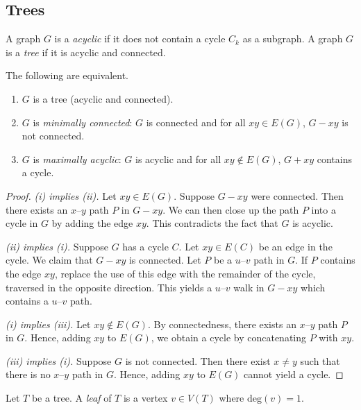 \subsection{Trees}
\begin{definition}
	A graph \( G \) is a \emph{acyclic} if it does not contain a cycle \( C_k \) as a subgraph.
	A graph \( G \) is a \emph{tree} if it is acyclic and connected.
\end{definition}
\begin{proposition}
	The following are equivalent.
	\begin{enumerate}
		\item \( G \) is a tree (acyclic and connected).
		\item \( G \) is \emph{minimally connected}: \( G \) is connected and for all \( xy \in E(G) \), \( G - xy \) is not connected.
		\item \( G \) is \emph{maximally acyclic}: \( G \) is acyclic and for all \( xy \not\in E(G) \), \( G + xy \) contains a cycle.
	\end{enumerate}
\end{proposition}
\begin{proof}
	\emph{(i) implies (ii).}
	Let \( xy \in E(G) \).
	Suppose \( G - xy \) were connected.
	Then there exists an \( x \)--\( y \) path \( P \) in \( G - xy \).
	We can then close up the path \( P \) into a cycle in \( G \) by adding the edge \( xy \).
	This contradicts the fact that \( G \) is acyclic.

	\emph{(ii) implies (i).}
	Suppose \( G \) has a cycle \( C \).
	Let \( xy \in E(C) \) be an edge in the cycle.
	We claim that \( G - xy \) is connected.
	Let \( P \) be a \( u \)--\( v \) path in \( G \).
	If \( P \) contains the edge \( xy \), replace the use of this edge with the remainder of the cycle, traversed in the opposite direction.
	This yields a \( u \)--\( v \) walk in \( G - xy \) which contains a \( u \)--\( v \) path.

	\emph{(i) implies (iii).}
	Let \( xy \not\in E(G) \).
	By connectedness, there exists an \( x \)--\( y \) path \( P \) in \( G \).
	Hence, adding \( xy \) to \( E(G) \), we obtain a cycle by concatenating \( P \) with \( xy \).

	\emph{(iii) implies (i).}
	Suppose \( G \) is not connected.
	Then there exist \( x \neq y \) such that there is no \( x \)--\( y \) path in \( G \).
	Hence, adding \( xy \) to \( E(G) \) cannot yield a cycle.
\end{proof}
\begin{definition}
	Let \( T \) be a tree.
	A \emph{leaf} of \( T \) is a vertex \( v \in V(T) \) where \( \mathrm{deg}(v) = 1 \).
\end{definition}

